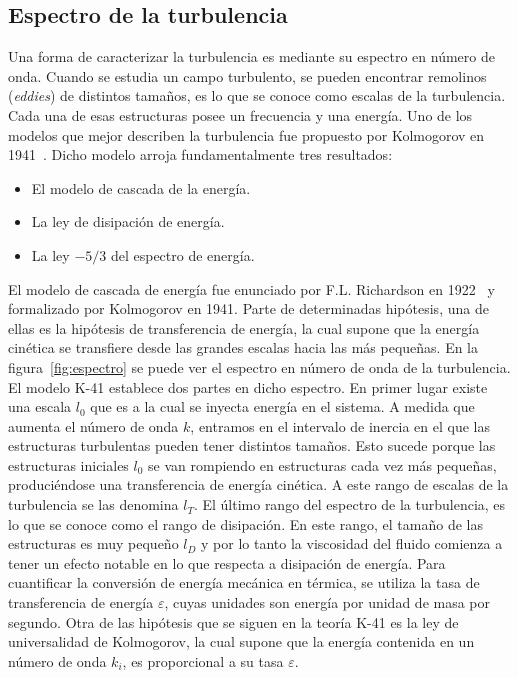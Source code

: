 \subsection{Espectro de la turbulencia}
Una forma de caracterizar la turbulencia es mediante su espectro en número de onda.
Cuando se estudia un campo turbulento, se pueden encontrar remolinos (\textit{eddies}) de distintos
tamaños, es lo que se conoce como escalas de la turbulencia. Cada una de esas estructuras
posee un frecuencia y una energía.
Uno de los modelos que mejor describen la turbulencia fue propuesto por Kolmogorov en
1941~\cite{20000584634}. Dicho modelo arroja fundamentalmente tres resultados:
\begin{itemize}
    \item El modelo de cascada de la energía.
    \item La ley de disipación de energía.
    \item La ley $-5/3$ del espectro de energía.
\end{itemize}
El modelo de cascada de energía fue enunciado por F.L. Richardson en 1922~\cite{richardson_lynch_2007} y formalizado
por Kolmogorov en 1941\cite{20000584634}. Parte de determinadas hipótesis, una de ellas es la hipótesis de
transferencia de energía, la cual supone que la energía cinética se transfiere desde las grandes
escalas hacia las más pequeñas.
En la figura~\ref{fig:espectro} se puede ver el espectro en número de onda de la turbulencia. El modelo
K-41 establece dos partes en dicho espectro. En primer lugar existe una escala $l_0$ que es a la
cual se inyecta energía en el sistema.
A medida que aumenta el número de onda $k$, entramos en el intervalo de inercia en el que
las estructuras turbulentas pueden tener distintos tamaños. Esto sucede porque las estructuras
iniciales $l_0$ se van rompiendo en estructuras cada vez más pequeñas, produciéndose una
transferencia de energía cinética. A este rango de escalas de la turbulencia se las denomina
$l_T$. El último rango del espectro de la turbulencia, es lo que se conoce como el rango de
disipación. En este rango, el tamaño de las estructuras es muy pequeño $l_D$ y por lo tanto la
viscosidad del fluido comienza a tener un efecto notable en lo que respecta a disipación de
energía. Para cuantificar la conversión de energía mecánica en térmica, se utiliza la tasa de
transferencia de energía $\varepsilon$, cuyas unidades son energía por unidad de masa por segundo.
Otra de las hipótesis que se siguen en la teoría K-41 es la ley de universalidad de Kolmogorov,
la cual supone que la energía contenida en un número de onda $k_i$, es proporcional a su tasa $\varepsilon$. 
